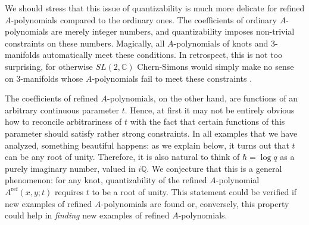 \documentclass[hyper,letterpaper]{JHEP3}
\newcommand{\C}{{\mathbb C}}
\begin{document}
We should stress that this issue of quantizability is much more delicate for refined $A$-polynomials compared to the ordinary ones.
The coefficients of ordinary $A$-polynomials are merely integer numbers, and quantizability imposes non-trivial constraints on these numbers.
Magically, all $A$-polynomials of knots and 3-manifolds automatically meet these conditions.
In retrospect, this is not too surprising, for otherwise $SL(2,\C)$ Chern-Simons would simply make no sense
on 3-manifolds whose $A$-polynomials fail to meet these constraints \cite{Apol}.

The coefficients of refined $A$-polynomials, on the other hand, are functions of an arbitrary continuous parameter $t$.
Hence, at first it may not be entirely obvious how to reconcile arbitrariness of $t$
with the fact that certain functions of this parameter should satisfy rather strong constraints.
In all examples that we have analyzed, something beautiful happens:
as we explain below, it turns out that $t$ can be any root of unity.
Therefore, it is also natural to think of $\hbar=\log q$ as a purely imaginary number, valued in $i \mathbb{Q}$.
We conjecture that this is a general phenomenon: for any knot, quantizability of the refined $A$-polynomial
$A^{\textrm{ref}}(x,y;t)$ requires $t$ to be a root of unity.
This statement could be verified if new examples of refined $A$-polynomials are found or, conversely,
this property could help in \emph{finding} new examples of refined $A$-polynomials.
\end{document}
